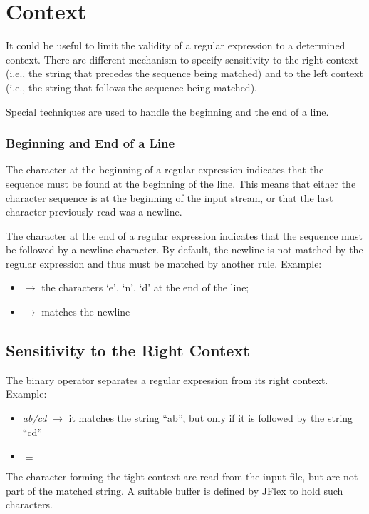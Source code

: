 \section{Context}
It could be useful to limit the validity of a regular expression to a determined context.
There are different mechanism to specify sensitivity to the right context (i.e., the string that precedes the sequence being matched) and to the left context (i.e., the string that follows the sequence being matched).

Special techniques are used to handle the beginning and the end of a line.

\subsubsection{Beginning and End of a Line}
The character \code{^} at the beginning of a regular expression indicates that the sequence must be found at the beginning of the line. This means that either the character sequence is at the beginning of the input stream, or that the last character previously read was a newline.

The character \code{\$} at the end of a regular expression indicates that the sequence must be followed by a newline character.
By default, the newline is not matched by the regular expression and thus must be matched by another rule.
Example:
\begin{itemize}
    \item {} $\to$ the characters `e', `n', `d' at the end of the line;
    \item \code{\\r\|\\n\|\\r\\n} $\to$ matches the newline
\end{itemize}

\subsection{Sensitivity to the Right Context}
The binary operator \code{\/} separates a regular expression from its right context.
Example:
\begin{itemize}
    \item[] \emph{ab/cd} $\to$ it matches the string ``ab'', but only if it is followed by the string ``cd''
    \item[]  $\equiv$ 
\end{itemize}
The character forming the tight context are read from the input file, but are not part of the matched string.
A suitable buffer is defined by JFlex to hold such characters.

